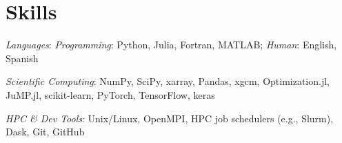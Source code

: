 \documentclass[a4paper, 11pt]{article}
\begin{document}
\section{Skills}
\skillListStart
\justifying
\item \emph{Languages}: \textit{Programming}: Python, Julia, Fortran, MATLAB; \textit{Human}: English, Spanish
\item \emph{Scientific Computing}: NumPy, SciPy, xarray, Pandas, xgcm,  Optimization.jl, JuMP.jl, scikit-learn, PyTorch, TensorFlow, keras
\item \emph{HPC \& Dev Tools}: Unix/Linux, OpenMPI, HPC job schedulers (e.g., Slurm), Dask, Git, GitHub
\skillListEnd
\end{document}
